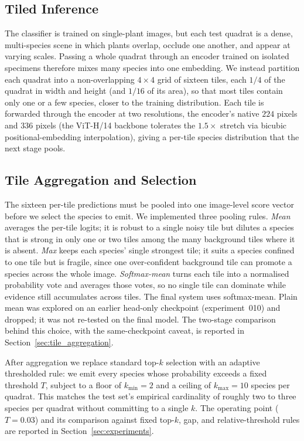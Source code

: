 \subsection{Tiled Inference}
\label{sec:adaptive_inference}

The classifier is trained on single-plant images, but each test quadrat is a dense, multi-species
scene in which plants overlap, occlude one another, and appear at varying scales. Passing a whole
quadrat through an encoder trained on isolated specimens therefore mixes many species into one
embedding. We instead partition each quadrat into a non-overlapping
$4\times4$ grid of sixteen tiles, each $1/4$ of the quadrat in width and height (and $1/16$ of
its area), so that most tiles contain only one or a few species, closer to the training
distribution. Each tile is forwarded through the encoder
at two resolutions, the encoder's native $224$ pixels and $336$ pixels (the ViT-H/14 backbone
tolerates the $1.5\times$ stretch via bicubic positional-embedding interpolation), giving a
per-tile species distribution that the next stage pools.

\subsection{Tile Aggregation and Selection}
\label{sec:tile_agg_method}

The sixteen per-tile predictions must be pooled into one image-level score vector before we
select the species to emit. We implemented three pooling rules. \emph{Mean} averages the per-tile
logits; it is robust to a single noisy tile but dilutes a species that is strong in only one or
two tiles among the many background tiles where it is absent. \emph{Max} keeps each species'
single strongest tile; it suits a species confined to one tile but is fragile, since one
over-confident background tile can promote a species across the whole image. \emph{Softmax-mean}
turns each tile into a normalised probability vote and averages those votes, so no single tile can
dominate while evidence still accumulates across tiles. The final system uses softmax-mean. Plain mean was explored on an earlier head-only checkpoint
(experiment~010) and dropped; it was not re-tested on the final model. The two-stage comparison
behind this choice, with the same-checkpoint caveat, is reported in
Section~\ref{sec:tile_aggregation}.

After aggregation we replace standard top-$k$ selection with an adaptive thresholded rule: we emit
every species whose probability exceeds a fixed threshold $T$, subject to a floor of $k_{\min}{=}2$
and a ceiling of $k_{\max}{=}10$ species per quadrat. This matches the test set's empirical
cardinality of roughly two to three species per quadrat without committing to a single $k$. The
operating point ($T{=}0.03$) and its comparison against fixed top-$k$, gap, and relative-threshold
rules are reported in Section~\ref{sec:experiments}.

